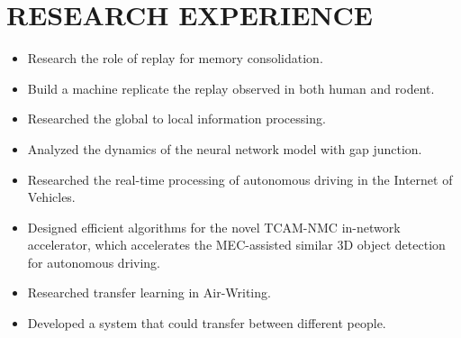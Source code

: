 \documentclass{resume}
\begin{document}
\section{{\bfseries RESEARCH EXPERIENCE}}
\begin{itemize}[parsep=0.2ex]
  \item Research the role of replay for memory consolidation.
  \item Build a machine replicate the replay observed in both human and rodent.
\end{itemize}
\begin{itemize}[parsep=0.2ex]
  \item Researched the global to local information processing.
  \item Analyzed the dynamics of the neural network model with gap junction.
\end{itemize}
\begin{itemize}[parsep=0.2ex]
  \item Researched the real-time processing of autonomous driving in the Internet of Vehicles.
  \item Designed efficient algorithms for the novel TCAM-NMC in-network accelerator, which accelerates the MEC-assisted similar 3D object detection for autonomous driving.
\end{itemize}
\begin{itemize}[parsep=0.2ex]
  \item Researched transfer learning in Air-Writing.
  \item Developed a system that could transfer between different people.
\end{itemize}

\end{document}
